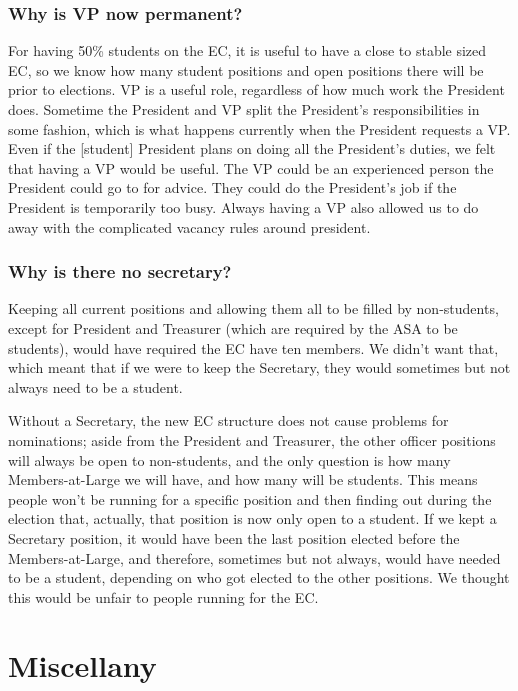 \documentclass{article}
\begin{document}
\subsubsection*{Why is VP now permanent?}
For having 50\% students on the EC, it is useful to have a close to stable sized EC, so we know how many student positions and open positions there will be prior to elections. VP is a useful role, regardless of how much work the President does. Sometime the President and VP split the President's responsibilities in some fashion, which is what happens currently when the President requests a VP. Even if the [student] President plans on doing all the President's duties, we felt that having a  VP would be useful. The VP could be an experienced person the President could go to for advice. They could do the President's job if the President is temporarily too busy. Always having a VP also allowed us to do away with the complicated vacancy rules around president.

\subsubsection*{Why is there no secretary?}
Keeping all current positions and allowing them all to be filled by non-students, except for President and Treasurer (which are required by the ASA to be students), would have required the EC have ten members. We didn't want that, which meant that if we were to keep the Secretary, they would sometimes but not always need to be a student.

Without a Secretary, the new EC structure does not cause problems for nominations; aside from the President and Treasurer, the other officer positions will always be open to non-students, and the only question is how many Members-at-Large we will have, and how many will be students. This means people won't be running for a specific position and then finding out during the election that, actually, that position is now only open to a student. If we kept a Secretary position, it would have been the last position elected before the Members-at-Large, and therefore, sometimes but not always, would have needed to be a student, depending on who got elected to the other positions. We thought this would be unfair to people running for the EC.


\section{Miscellany}
\end{document}

